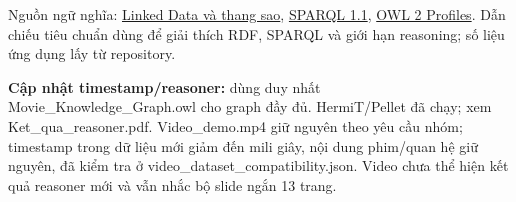 \documentclass[
  11pt,
]{article}
\begin{document}
Nguồn ngữ nghĩa:
\href{https://www.w3.org/DesignIssues/LinkedData.html}{Linked Data và
thang sao}, \href{https://www.w3.org/TR/sparql11-query/}{SPARQL 1.1},
\href{https://www.w3.org/TR/owl2-profiles/}{OWL 2 Profiles}. Dẫn chiếu
tiêu chuẩn dùng để giải thích RDF, SPARQL và giới hạn reasoning; số liệu
ứng dụng lấy từ repository.

\textbf{Cập nhật
timestam\allowbreak{}p/\allowbreak{}reason\allowbreak{}er:\allowbreak{}}
dùng duy nhất
Movie\_\allowbreak{}\allowbreak{}Kn\allowbreak{}owledge\_\allowbreak{}\allowbreak{}Graph.\allowbreak{}ow\allowbreak{}l
cho graph đầy đủ.
Hermi\allowbreak{}T/\allowbreak{}\allowbreak{}P\allowbreak{}ellet đã
chạy; xem
Ket\_\allowbreak{}qua\_\allowbreak{}reasoner\allowbreak{}.\allowbreak{}pdf.\allowbreak{}
Video\_\allowbreak{}de\allowbreak{}mo.\allowbreak{}mp4 giữ nguyên theo
yêu cầu nhóm; timestamp trong dữ liệu mới giảm đến mili giây, nội dung
phim/quan hệ giữ nguyên, đã kiểm tra ở
video\_\allowbreak{}da\allowbreak{}taset\_\allowbreak{}co\allowbreak{}mpatibil\allowbreak{}ity.\allowbreak{}json\allowbreak{}.\allowbreak{}
Video chưa thể hiện kết quả reasoner mới và vẫn nhắc bộ slide ngắn 13
trang.
\end{document}
